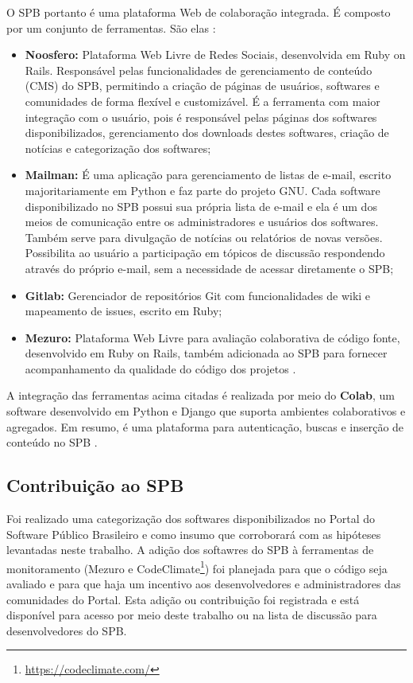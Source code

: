 O SPB portanto é uma plataforma Web de colaboração integrada. É composto por um
conjunto de ferramentas. São elas \cite{aboutSPB}:

\begin{itemize}
  \item \textbf{Noosfero:} Plataforma Web Livre de Redes Sociais, desenvolvida
	em Ruby on Rails. Responsável pelas funcionalidades de gerenciamento de
	conteúdo (CMS) do SPB, permitindo a criação de páginas de usuários, softwares
	e comunidades de forma flexível e customizável. É a ferramenta com maior
	integração com o usuário, pois é responsável pelas páginas dos softwares
	disponibilizados, gerenciamento dos downloads destes softwares, criação de
	notícias e categorização dos softwares;
  \item \textbf{Mailman:} É uma aplicação para gerenciamento de listas de
	e-mail, escrito majoritariamente em Python e faz parte do projeto GNU. Cada
	software disponibilizado no SPB possui sua própria lista de e-mail e ela é um
	dos meios de comunicação entre os administradores e usuários dos softwares.
	Também serve para divulgação de notícias ou relatórios de novas versões.
	Possibilita ao usuário a participação em tópicos de discussão respondendo
	através do próprio e-mail, sem a necessidade de acessar diretamente o SPB;
	\item \textbf{Gitlab:} Gerenciador de repositórios Git com funcionalidades de
	wiki e mapeamento de issues, escrito em Ruby;
	\item \textbf{Mezuro:} Plataforma Web Livre para avaliação colaborativa de
	código fonte, desenvolvido em Ruby on Rails, também adicionada ao SPB para
	fornecer acompanhamento da qualidade do código dos projetos \cite{aboutSPB}.
\end{itemize}

A integração das ferramentas acima citadas é realizada por meio do
\textbf{Colab}, um software desenvolvido em Python e Django que suporta
ambientes colaborativos e agregados. Em resumo, é uma plataforma para
autenticação, buscas e inserção de conteúdo no SPB \cite{aboutSPB}.


\subsection{Contribuição ao SPB}

Foi realizado uma categorização dos softwares disponibilizados no Portal do Software Público Brasileiro e como insumo que corroborará com as hipóteses levantadas neste trabalho. A adição dos softawres do SPB à ferramentas de monitoramento (Mezuro e CodeClimate\footnote{\url{https://codeclimate.com/}}) foi planejada para que o código seja avaliado e para que haja um incentivo aos desenvolvedores e administradores das comunidades do Portal. Esta adição ou contribuição foi registrada e está disponível para acesso por meio deste trabalho ou na lista de discussão para desenvolvedores do SPB.

